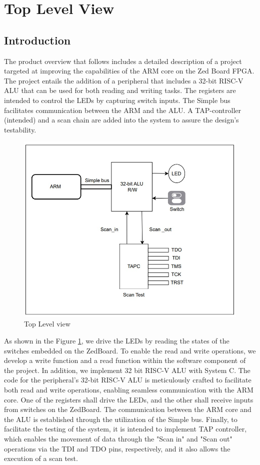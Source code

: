 \documentclass[a4paper,12pt,english]{report}
\begin{document}
    
\section{Top Level View}
\subsection{Introduction}

The product overview that follows includes a detailed description of a project targeted at improving the capabilities of the ARM core on the Zed Board FPGA. The project entails the addition of a peripheral that includes a 32-bit RISC-V ALU that can be used for both reading and writing tasks. The registers are intended to control the LEDs by capturing switch inputs. The Simple bus facilitates communication between the ARM and the ALU. A TAP-controller (intended) and a scan chain are added into the system to assure the design's testability.

\begin{figure}[h!]
  \centering
  \includegraphics[width=0.7\linewidth]{FBD.jpg}
  \caption{Top Level view}
  \label{ref:TLV}
\end{figure}

As shown in the Figure \ref{ref:TLV}, we drive the LEDs by reading the states of the switches embedded on the ZedBoard. To enable the read and write operations, we develop a write function and a read function within the software component of the project. In addition, we implement 32 bit RISC-V ALU with System C. The code for the peripheral's 32-bit RISC-V ALU is meticulously crafted to facilitate both read and write operations, enabling seamless communication with the ARM core. One of the registers shall drive the LEDs, and the other shall receive inputs from switches on the ZedBoard. The communication between the ARM core and the ALU is established through the utilization of the Simple bus. Finally, to facilitate the testing of the system, it is intended to implement TAP controller, which enables the movement of data through the "Scan in" and "Scan out" operations via the TDI and TDO pins, respectively, and it also allows the execution of a scan test. 
\end{document}

